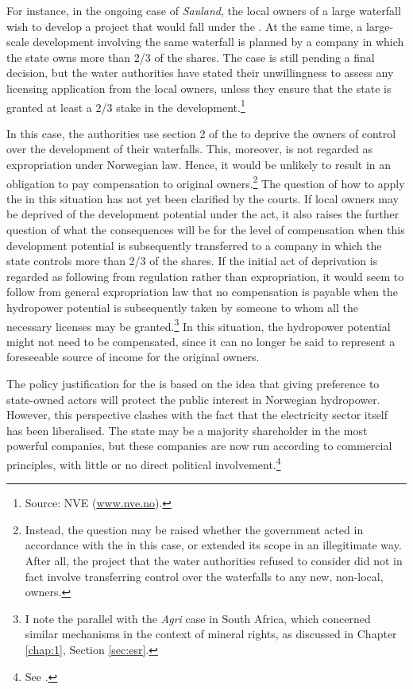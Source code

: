 For instance, in the ongoing case of {\it Sauland}, the local owners of a large waterfall wish to develop a project that would fall under the \cite{ica17}. At the same time, a large-scale development involving the same waterfall is planned by a company in which the state owns more than 2/3 of the shares. The case is still pending a final decision, but the water authorities have stated their unwillingness to assess any licensing application from the local owners, unless they ensure that the state is granted at least a 2/3 stake in the development.\footnote{Source: NVE (\url{www.nve.no}).}

In this case, the authorities use section 2 of the \cite{ica17} to deprive the owners of control over the development of their waterfalls. This, moreover, is not regarded as expropriation under Norwegian law. Hence, it would be unlikely to result in an obligation to pay compensation to original owners.\footnote{Instead, the question may be raised whether the government acted in accordance with the \cite{ica17} in this case, or extended its scope in an illegitimate way. After all, the project that the water authorities refused to consider did not in fact involve transferring control over the waterfalls to any new, non-local, owners.} The question of how to apply the \cite{ica17} in this situation has not yet been clarified by the courts. If local owners may be deprived of the development potential under the act, it also raises the further question of what the consequences will be for the level of compensation when this development potential is subsequently transferred to a company in which the state controls more than 2/3 of the shares. If the initial act of deprivation is regarded as following from regulation rather than expropriation, it would seem to follow from general expropriation law that no compensation is payable when the hydropower potential is subsequently taken by someone to whom all the necessary licenses may be granted.\footnote{I note the parallel with the {\it Agri} case in South Africa, which concerned similar mechanisms in the context of mineral rights, as discussed in Chapter \ref{chap:1}, Section \ref{sec:esr}.} In this situation, the hydropower potential might not need to be compensated, since it can no longer be said to represent a foreseeable source of income for the original owners.

The policy justification for the \cite{ica17} is based on the idea that giving preference to state-owned actors will protect the public interest in Norwegian hydropower. However, this perspective clashes with the fact that the electricity sector itself has been liberalised. The state may be a majority shareholder in the most powerful companies, but these companies are now run according to commercial principles, with little or no direct political involvement.\footnote{See \cite[86]{efta07}.}


